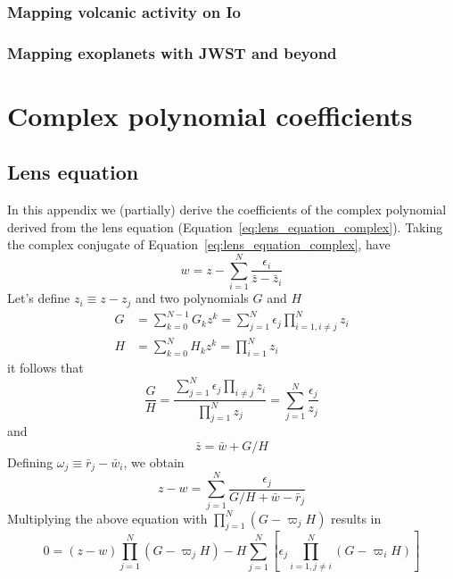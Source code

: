 \documentclass[12pt,dvipsnames]{report}
\begin{document}
\subsection{Mapping volcanic activity on Io}
\subsection{Mapping exoplanets with JWST and beyond}

\appendix

\chapter{Complex polynomial coefficients}
\label{app:complex_poly}
\section{Lens equation}
In this appendix we (partially) derive the coefficients of the complex
polynomial derived from the lens equation
(Equation~\ref{eq:lens_equation_complex}). Taking the complex conjugate of
Equation~\ref{eq:lens_equation_complex}, have
\begin{equation}
    w=z-\sum_{i=1}^{N} \frac{\epsilon_{i}}{\bar{z}-\bar{z}_{i}}
\end{equation}
Let's define $z_i\equiv z - z_j$ and two polynomials $G$ and $H$
\begin{align}
    G & =\sum_{k=0}^{N-1} G_{k} z^{k} =\sum_{j=1}^{N} \epsilon_{j} \prod_{i=1, i \neq j}^{N} z_{i} \\
    H & =\sum_{k=0}^{N} H_{k} z^{k}   =\prod_{i=1}^{N} z_{i}
\end{align}
it follows that
\begin{equation}
    \frac{G}{H}=\frac{\sum_{j=1}^{N} \epsilon_{j}
        \prod_{i \neq j} z_{i}}{\prod_{j=1}^{N} z_{j}}=\sum_{j=1}^{N} \frac{\epsilon_{j}}{z_{j}}
\end{equation}
and
\begin{equation}
    \bar{z}=\bar{w}+G / H
\end{equation}
Defining $\omega_{j} \equiv \bar{r}_{j}-\bar{w}_{i}$, we obtain
\begin{equation}
    z-w=\sum_{j=1}^{N} \frac{\epsilon_{j}}{G / H+\bar{w}-\bar{r}_{j}}
\end{equation}
Multiplying the above equation with $\prod_{j=1}^{N}\left(G-\varpi_{j} H\right)$
results in
\begin{equation}
    0=(z-w) \prod_{j=1}^{N}\left(G-\varpi_{j} H\right)-
    H \sum_{j=1}^{N}\left[\epsilon_{j} \prod_{i=1, j \neq i}^{N}\left(G-\varpi_{i} H\right)\right]
    \label{eq:complex_poly}
\end{equation}
\end{document}
